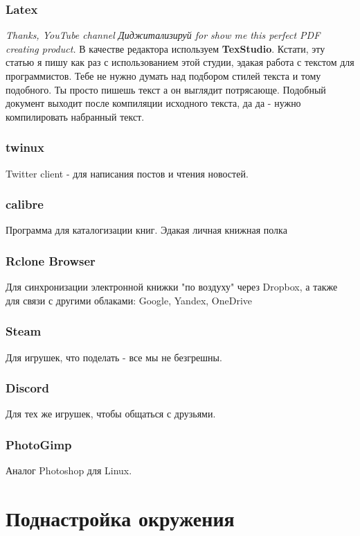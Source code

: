 \documentclass[a4paper, 12pt]{report}
\begin{document}
\subsection{Latex}
\textit{Thanks, YouTube channel Диджитализируй for show me this perfect PDF creating product.}
В качестве редактора используем \textbf{TexStudio}. Кстати, эту статью я пишу как раз с использованием этой студии, эдакая работа с текстом для программистов. Тебе не нужно думать над подбором стилей текста и тому подобного. Ты просто пишешь текст а он выглядит потрясающе. Подобный документ выходит после компиляции исходного текста, да да - нужно компилировать набранный текст.

\subsection{twinux} Twitter client - для написания постов и чтения новостей.
\subsection{calibre} Программа для каталогизации книг. Эдакая личная книжная полка
\subsection{Rclone Browser} Для синхронизации электронной книжки "по воздуху" через Dropbox, а также для связи с другими облаками: Google, Yandex, OneDrive
\subsection{Steam} Для игрушек, что поделать - все мы не безгрешны.
\subsection{Discord} Для тех же игрушек, чтобы общаться с друзьями.
\subsection{PhotoGimp} Аналог Photoshop для Linux.

\chapter{Поднастройка окружения}
\end{document}
